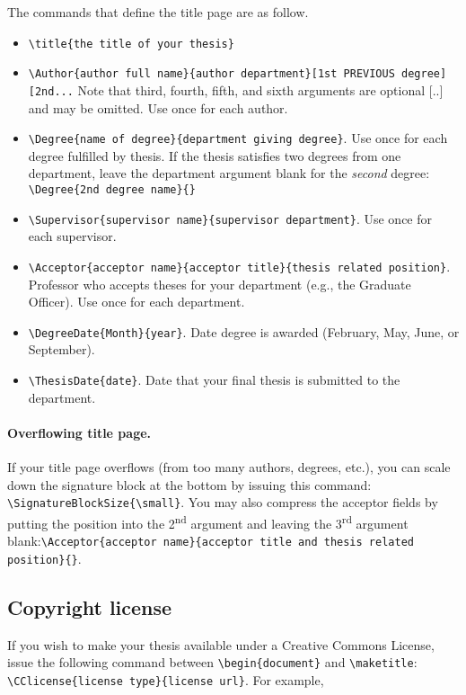 \documentclass[11pt]{article}
\begin{document}
The commands that define the title page are as follow.
\begin{itemize}
\item \verb|\title{the title of your thesis}|

\item \verb|\Author{author full name}{author department}[1st PREVIOUS degree][2nd...| \linebreak
Note that third, fourth, fifth, and sixth arguments are optional [..] and may be omitted.  Use once for each author.

\item \verb|\Degree{name of degree}{department giving degree}|. Use once for each degree fulfilled by thesis. If the thesis satisfies two degrees from one department, leave the department argument blank for the \textit{second} degree: \verb|\Degree{2nd degree name}{}|

\item \verb|\Supervisor{supervisor name}{supervisor department}|. Use once for each supervisor.

\item \verb|\Acceptor{acceptor name}{acceptor title}{thesis related position}|. Professor who accepts theses for your department (e.g., the Graduate Officer). Use once for each department. 

\item \verb|\DegreeDate{Month}{year}|. Date degree is awarded (February, May, June, or September).  

\item \verb|\ThesisDate{date}|. Date that your final thesis is submitted to the department.
\end{itemize}
\paragraph{Overflowing title page.} If your title page overflows (from too many authors, degrees, etc.), you can scale down the signature block at the bottom by issuing this command: \verb|\SignatureBlockSize{\small}|. You may also compress the acceptor fields by putting the position into the 2\textsuperscript{nd} argument and leaving the 3\textsuperscript{rd} argument blank:\verb|\Acceptor{acceptor name}{acceptor title and thesis related position}{}|.


\subsection*{Copyright license}
If you wish to make your thesis available under a Creative Commons License, issue the following command between
\verb|\begin{document}| and \verb|\maketitle|: \verb|\CClicense{license type}{license url}|.  For example,
 
\end{document}

